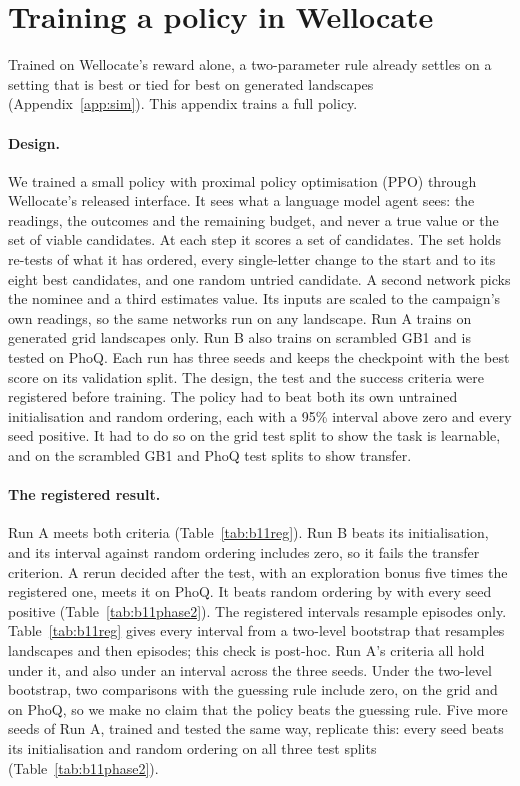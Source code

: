 \section{Training a policy in Wellocate}
\label{app:b11}

Trained on Wellocate's reward alone, a two-parameter rule already settles on a setting that is best or tied for
best on generated landscapes (Appendix~\ref{app:sim}). This appendix trains a full policy.

\paragraph{Design.} We trained a small policy with proximal policy optimisation (PPO) through Wellocate's released
interface. It sees what a language model agent sees: the readings, the outcomes and the remaining budget, and never a
true value or the set of viable candidates. At each step it scores a set of candidates. The set holds re-tests of
what it has ordered, every single-letter change to the start and to its eight best candidates, and one random untried
candidate. A second network picks the nominee and a third estimates value. Its inputs are scaled to the campaign's own
readings, so the same networks run on any landscape. Run A trains on generated grid landscapes only. Run B also
trains on scrambled GB1 and is tested on PhoQ. Each run has three seeds and keeps the checkpoint with the best score
on its validation split. The design, the test and the success criteria were registered before training. The policy had to beat both its own untrained
initialisation and random ordering, each with a 95\% interval above zero and every seed positive. It had to do so on
the grid test split to show the task is learnable, and on the scrambled GB1 and PhoQ test splits to show transfer.

\paragraph{The registered result.} Run A meets both criteria (Table~\ref{tab:b11reg}). Run B beats its initialisation,
and its interval against random ordering includes zero, so it fails the transfer criterion. A rerun decided after the
test, with an exploration bonus five times the registered one, meets it on PhoQ. It beats random ordering by
\nPolEntRandPq{} \nPolEntRandPqci{} with every seed positive (Table~\ref{tab:b11phase2}). The registered intervals
resample episodes only. Table~\ref{tab:b11reg} gives every interval from a two-level bootstrap that resamples
landscapes and then episodes; this check is post-hoc. Run A's criteria all hold under it, and also under an interval
across the three seeds. Under the two-level bootstrap, two comparisons with the guessing rule include zero, on the grid and on PhoQ, so we make no
claim that the policy beats the guessing rule. Five more seeds of Run A, trained and tested the same way, replicate
this: every seed beats its initialisation and random ordering on all three test splits (Table~\ref{tab:b11phase2}).


